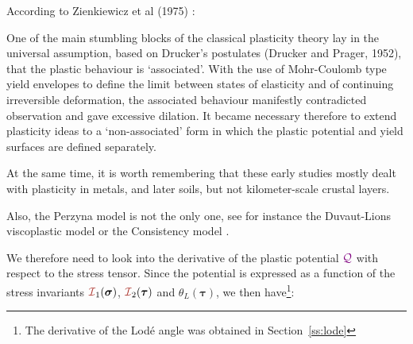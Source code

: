 According to Zienkiewicz et al (1975) \cite{zihl75}:
\begin{displayquote}
{\color{darkgray}
One of the main stumbling blocks of the 
classical plasticity theory lay in the universal
assumption, based on Drucker's postulates (Drucker and Prager, 1952), that the plastic 
behaviour is `associated'. With the use of Mohr-Coulomb type yield envelopes to define the
limit between states of elasticity and of continuing irreversible deformation,
the associated behaviour manifestly contradicted observation and gave excessive dilation.
It became necessary therefore to extend plasticity ideas to a `non-associated'
form in which the plastic potential and yield surfaces are defined separately.}
\end{displayquote}
At the same time, it is worth remembering that these early studies mostly dealt
with plasticity in metals, and later soils, but not kilometer-scale crustal layers.

Also, the Perzyna model is not the only one, see for instance
the Duvaut-Lions viscoplastic model or the Consistency model \cite{wasd97,hesd02}.

We therefore need to look into the derivative of the plastic potential ${{\color{violet}\cal Q}}$
with respect to the stress tensor. Since the potential 
is expressed as a function of the stress invariants ${\III}_1(\bm\sigma)$,
${\III}_2(\bm\tau)$ and $\theta_L(\bm\tau)$, we then have\footnote{
The derivative of the Lod\'e angle was obtained in Section~\ref{ss:lode}}:

